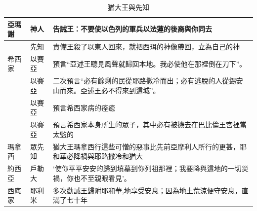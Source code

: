 \begin{table}[!hbp]
\begin{tabular}{|p{1.3cm}|p{2.5cm}|p{13cm}|}
 亞瑪謝& 神人 & 告誡王：不要使以色列的軍兵以法蓮的後裔與你同去 \\\hline 
  & 先知 & 責備王殺了以東人回來，就把西珥的神像帶回，立為自己的神 \\\hline 
   希西家& 以賽亞  & 預言“亞述王聽見風聲就歸回本地。我必使他在那裡倒在刀下”。\\\hline 
   &以賽亞  & 二次預言“必有餘剩的民從耶路撒冷而出；必有逃脫的人從錫安山而來。亞述王必不得來到這城”。\\\hline 
 & 以賽亞  &預言希西家病的痊癒 \\\hline 
  & 以賽亞  &預言希西家本身所生的眾子，其中必有被擄去在巴比倫王宮裡當太監的 \\\hline 
 瑪拿西& 眾先知  & 猶大王瑪拿西行這些可憎的惡事比先前亞摩利人所行的更甚，耶和華必降禍與耶路撒冷和猶大\\\hline 
 約西亞& 戶勒大  & ‘使你平平安安的歸到墳墓到你列祖那裡；我要降與這地的一切災禍，你也不至親眼看見'。\\\hline     
 西底家&耶利米&多次勸誡王歸附耶和華,地享受安息；因為地土荒涼便守安息，直滿了七十年\\\hline     
\end{tabular} 
\caption{猶大王與先知}
\end{table}

